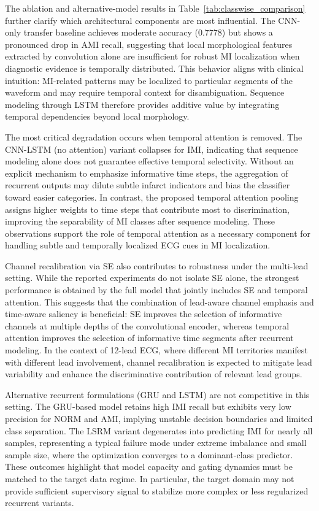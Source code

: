\documentclass[preprint,12pt]{elsarticle}
\begin{document}
The ablation and alternative-model results in Table~\ref{tab:classwise_comparison} further clarify which architectural components are most influential. The CNN-only transfer baseline achieves moderate accuracy (0.7778) but shows a pronounced drop in AMI recall, suggesting that local morphological features extracted by convolution alone are insufficient for robust MI localization when diagnostic evidence is temporally distributed. This behavior aligns with clinical intuition: MI-related patterns may be localized to particular segments of the waveform and may require temporal context for disambiguation. Sequence modeling through LSTM therefore provides additive value by integrating temporal dependencies beyond local morphology.

The most critical degradation occurs when temporal attention is removed. The CNN-LSTM (no attention) variant collapses for IMI, indicating that sequence modeling alone does not guarantee effective temporal selectivity. Without an explicit mechanism to emphasize informative time steps, the aggregation of recurrent outputs may dilute subtle infarct indicators and bias the classifier toward easier categories. In contrast, the proposed temporal attention pooling assigns higher weights to time steps that contribute most to discrimination, improving the separability of MI classes after sequence modeling. These observations support the role of temporal attention as a necessary component for handling subtle and temporally localized ECG cues in MI localization.

Channel recalibration via SE also contributes to robustness under the multi-lead setting. While the reported experiments do not isolate SE alone, the strongest performance is obtained by the full model that jointly includes SE and temporal attention. This suggests that the combination of lead-aware channel emphasis and time-aware saliency is beneficial: SE improves the selection of informative channels at multiple depths of the convolutional encoder, whereas temporal attention improves the selection of informative time segments after recurrent modeling. In the context of 12-lead ECG, where different MI territories manifest with different lead involvement, channel recalibration is expected to mitigate lead variability and enhance the discriminative contribution of relevant lead groups.

Alternative recurrent formulations (GRU and LSTM) are not competitive in this setting. The GRU-based model retains high IMI recall but exhibits very low precision for NORM and AMI, implying unstable decision boundaries and limited class separation. The LSRM variant degenerates into predicting IMI for nearly all samples, representing a typical failure mode under extreme imbalance and small sample size, where the optimization converges to a dominant-class predictor. These outcomes highlight that model capacity and gating dynamics must be matched to the target data regime. In particular, the target domain may not provide sufficient supervisory signal to stabilize more complex or less regularized recurrent variants.
\end{document}

